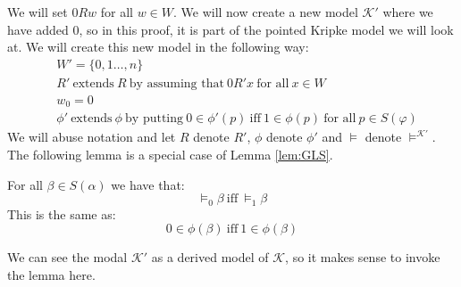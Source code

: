 \documentclass[../main.tex]{subfiles}
\begin{document}
We will set $0Rw$ for all $w\in W$. We will now create a new model
$\mathcal{K'}$ where we have added $0$, so in this proof, it is part of the
pointed Kripke model we will look at. We will create this new model in the
following way:
\begin{align*}
	&W'=\{0,1\ldots,n\}\\
	&R'\ \text{extends}\ R\ \text{by assuming that}\ 0R'x\ \text{for all}\
	x\in W\\
	&w_0=0\\
	&\phi'\ \text{extends}\ \phi\ \text{by putting}\ 0\in\phi'(p)\
	\text{iff}\ 1\in\phi(p)\ \text{for all}\ p\in S(\varphi)
\end{align*}
We will abuse notation and let $R$ denote $R'$, $\phi$ denote $\phi'$ and
$\vDash$ denote $\vDash^{\mathcal{K'}}$.
The following lemma is a special case of Lemma \ref{lem:GLS}.
\begin{lem}
	For all $\beta\in S(\alpha)$ we have that:
	\[\vDash_0\beta\ \text{iff}\ \vDash_1\beta \]
	This is the same as:
	\[0\in\phi(\beta)\ \text{iff}\ 1\in\phi(\beta)\]
\end{lem}
We can see the modal $\mathcal{K}'$ as a derived model of $\mathcal{K}$, so it
makes sense to invoke the lemma here.
\end{document}
